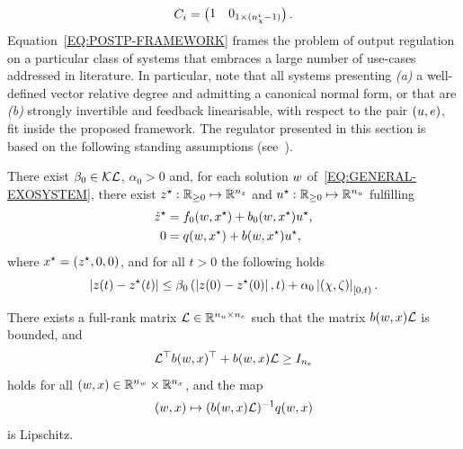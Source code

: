 \begin{equation*}
   C_i =
   \begin{pmatrix}
      1 & 0_{1 \times (n_{\chi}^i-1)}
   \end{pmatrix}.
\end{equation*}
Equation~\eqref{EQ:POSTP-FRAMEWORK} frames the problem of output regulation on a particular class of systems that embraces
a large number of use-cases addressed in literature. In particular, note that all systems presenting \textit{(a)} a well-defined vector
relative degree and admitting a canonical normal form, or that are \textit{(b)} strongly invertible and feedback linearisable,
with respect to the pair $\left( u, e \right)$, fit inside the proposed framework.
The regulator presented in this section is based on the following standing assumptions (see~\cite[Assumption~A1,~A2]{bin2019class}).
\begin{assumption}%
   There exist $\beta_0 \in \mathcal{KL}$, $\alpha_0 > 0$ and, for each solution $w$ of~\eqref{EQ:GENERAL-EXOSYSTEM},
   there exist $z^{\star} : \mathbb{R}_{\ge 0} \mapsto \mathbb{R}^{n_{z}}$ and $u^{\star} : \mathbb{R}_{\ge 0} \mapsto \mathbb{R}^{n_{u}}$ fulfilling
   \begin{equation}%
      \label{EQ:POSTP-REGULATOR-EQUATIONS}
      \begin{split}
         \dot{\zz}\s & = \zfun(\ww, \xx\s) + \zin(\ww, \xx\s)\uu\s, \\
         0 & = q(\ww, \xx\s) + \bfun(\ww, \xx\s)\uu\s,
      \end{split}
   \end{equation}
   where $x^{\star} = \left(z^{\star}, 0, 0\right)$, and for all $t > 0$ the following holds
   \begin{equation*}
      \left| z(t) - z^{\star}(t) \right| \le \beta_0\left(\left| z(0) - z^{\star}(0) \right|, t\right) + \alpha_0 \left| \left(\chi, \zeta\right) \right|_{\left[0,t\right)}.
   \end{equation*}
\end{assumption}
\begin{assumption}%
   There exists a full-rank matrix $\mathcal{L} \in \mathbb{R}^{n_{u} \times n_{e}}$ such that the matrix $b(w, x)\mathcal{L}$ is bounded, and
   \begin{equation*}
      \mathcal{L}^{\top} b(w, x)^{\top} + b(w, x) \mathcal{L} \ge I_{n_{e}}
   \end{equation*}
   holds for all $(w, x) \in \mathbb{R}^{n_{w}} \times \mathbb{R}^{n_{x}}$, and the map
   \begin{equation*}
      (w,x) \mapsto (b(w, x)\mathcal{L})^{-1} q(w, x)    
   \end{equation*}
   is Lipschitz.
\end{assumption}
